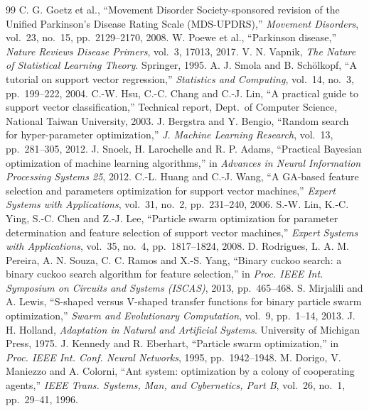 \documentclass[12pt,a4paper]{article}
\numberwithin{equation}{section}
\numberwithin{table}{section}
\numberwithin{figure}{section}
\begin{document}
\begin{thebibliography}{99}
 C. G. Goetz et al., ``Movement Disorder Society-sponsored revision of the Unified Parkinson's Disease Rating Scale (MDS-UPDRS),'' \emph{Movement Disorders}, vol.\ 23, no.\ 15, pp.\ 2129--2170, 2008.
 W. Poewe et al., ``Parkinson disease,'' \emph{Nature Reviews Disease Primers}, vol.\ 3, 17013, 2017.
 V. N. Vapnik, \emph{The Nature of Statistical Learning Theory}. Springer, 1995.
 A. J. Smola and B. Schölkopf, ``A tutorial on support vector regression,'' \emph{Statistics and Computing}, vol.\ 14, no.\ 3, pp.\ 199--222, 2004.
 C.-W. Hsu, C.-C. Chang and C.-J. Lin, ``A practical guide to support vector classification,'' Technical report, Dept.\ of Computer Science, National Taiwan University, 2003.
 J. Bergstra and Y. Bengio, ``Random search for hyper-parameter optimization,'' \emph{J. Machine Learning Research}, vol.\ 13, pp.\ 281--305, 2012.
 J. Snoek, H. Larochelle and R. P. Adams, ``Practical Bayesian optimization of machine learning algorithms,'' in \emph{Advances in Neural Information Processing Systems 25}, 2012.
 C.-L. Huang and C.-J. Wang, ``A GA-based feature selection and parameters optimization for support vector machines,'' \emph{Expert Systems with Applications}, vol.\ 31, no.\ 2, pp.\ 231--240, 2006.
 S.-W. Lin, K.-C. Ying, S.-C. Chen and Z.-J. Lee, ``Particle swarm optimization for parameter determination and feature selection of support vector machines,'' \emph{Expert Systems with Applications}, vol.\ 35, no.\ 4, pp.\ 1817--1824, 2008.
 D. Rodrigues, L. A. M. Pereira, A. N. Souza, C. C. Ramos and X.-S. Yang, ``Binary cuckoo search: a binary cuckoo search algorithm for feature selection,'' in \emph{Proc. IEEE Int. Symposium on Circuits and Systems (ISCAS)}, 2013, pp.\ 465--468.
 S. Mirjalili and A. Lewis, ``S-shaped versus V-shaped transfer functions for binary particle swarm optimization,'' \emph{Swarm and Evolutionary Computation}, vol.\ 9, pp.\ 1--14, 2013.
 J. H. Holland, \emph{Adaptation in Natural and Artificial Systems}. University of Michigan Press, 1975.
 J. Kennedy and R. Eberhart, ``Particle swarm optimization,'' in \emph{Proc. IEEE Int. Conf. Neural Networks}, 1995, pp.\ 1942--1948.
 M. Dorigo, V. Maniezzo and A. Colorni, ``Ant system: optimization by a colony of cooperating agents,'' \emph{IEEE Trans. Systems, Man, and Cybernetics, Part B}, vol.\ 26, no.\ 1, pp.\ 29--41, 1996.

\end{thebibliography}
\end{document}
